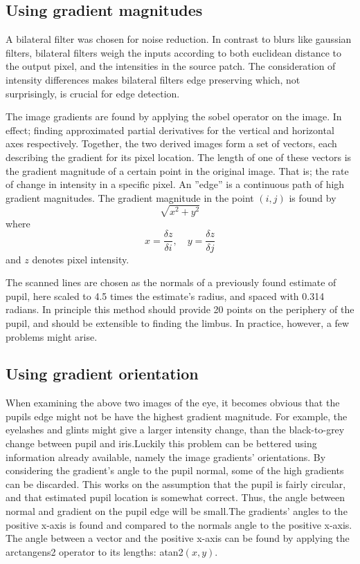 \subsection{Using gradient magnitudes}
A bilateral filter was chosen for noise reduction. In contrast to blurs like
gaussian filters, bilateral filters weigh the inputs according to both
euclidean distance to the output pixel, and the intensities in the source
patch. The consideration of intensity differences makes bilateral filters edge
preserving which, not surprisingly, is crucial for edge detection.

The image gradients are found by applying the sobel operator on the image. In
effect; finding approximated partial derivatives for the vertical and
horizontal axes respectively. Together, the two derived images form a set of
vectors, each describing the gradient for its pixel location. The length of one
of these vectors is the gradient magnitude of a certain point in the original
image. That is; the rate of change in intensity in a specific pixel. An
''edge'' is a continuous path of high gradient magnitudes. The gradient
magnitude in the point $(i,j)$ is found by $$\sqrt{x^2+y^2}$$ where $$x =
\frac{\delta z}{\delta i}, \quad y = \frac{\delta z}{\delta j}$$ and $z$
denotes pixel intensity. 

The scanned lines are chosen as the normals of a
previously found estimate of pupil, here scaled to 4.5 times the estimate’s
radius, and spaced with 0.314 radians. In principle this method should provide
20 points on the periphery of the pupil, and should be extensible to finding
the limbus. In practice, however, a few problems might arise.

\subsection{Using gradient orientation}
When examining the above two images of the eye, it becomes obvious that the
pupils edge might not be have the highest gradient magnitude. For example, the
eyelashes and glints might give a larger intensity change, than the
black-to-grey change between pupil and iris.Luckily this problem can be
bettered using information already available, namely the image gradients’
orientations. By considering the gradient’s angle to the pupil normal, some of
the high gradients can be discarded. This works on the assumption that the
pupil is fairly circular, and that estimated pupil location is somewhat
correct. Thus, the angle between normal and gradient on the pupil edge will be
small.The gradients’ angles to the positive x-axis is found and compared to the
normals angle to the positive x-axis. The angle between a vector and the
positive x-axis can be found by applying the arctangens2 operator to its
lengths: atan2$(x,y)$.

